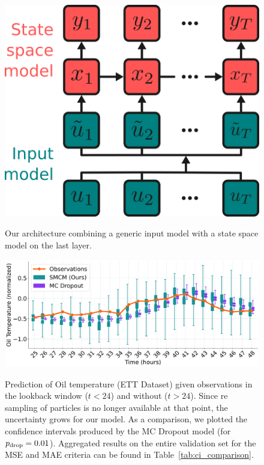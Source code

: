 \documentclass[journal]{IEEEtran}
\begin{document}
\begin{figure}[htpb]
	\centering
	\caption{Our architecture combining a generic input model with a state space model on the last layer.}
	\includegraphics[width=0.7\linewidth]{architecture.png}
	\label{fig:architecture}
\end{figure}

\begin{figure}[htpb]
	\centering
	\caption{Prediction of Oil temperature (ETT Dataset) given observations in the lookback window ($t<24$) and without ($t>24$).
		Since re sampling of particles is no longer available at that point, the uncertainty grows for our model.
		As a comparison, we plotted the confidence intervals produced by the MC Dropout model (for $p_\textnormal{drop}=0.01$).
		Aggregated results on the entire validation set for the MSE and MAE criteria can be found in Table~\ref{tab:ci_comparison}.}
	\includegraphics[width=\linewidth]{filter_kp24_ett.png}
	\label{fig:filter_k+24}
\end{figure}
\end{document}
